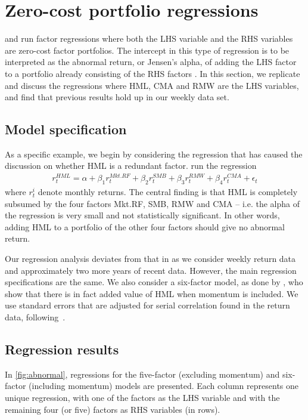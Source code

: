 
\section{Zero-cost portfolio regressions}
\label{sec:alpha_reg}
\textcite{FF2015} and \textcite{Asness2015} run factor regressions where both the LHS variable and the RHS variables are zero-cost factor portfolios. The intercept in this type of regression is to be interpreted as the abnormal return, or Jensen's alpha, of adding the LHS factor to a portfolio already consisting of the RHS factors \autocite{Jensen1968}. In this section, we replicate and discuss the regressions where HML, CMA and RMW are the LHS variables, and find that previous results hold up in our weekly data set.

\subsection{Model specification}

As a specific example, we begin by considering the regression that has caused the discussion on whether HML is a redundant factor. \textcite{FF2015} run the regression
\begin{align}
  r^{HML}_t = \alpha + \beta_1 r^{Mkt.RF}_t + \beta_2 r^{SMB}_t + \beta_3 r^{RMW}_t + \beta_4 r^{CMA}_t + \epsilon_t
\end{align}
where $r^i_t$ denote monthly returns. The central finding is that HML is completely subsumed by the four factors Mkt.RF, SMB, RMW and CMA -- i.e. the alpha of the regression is very small and not statistically significant. In other words, adding HML to a portfolio of the other four factors should give no abnormal return.

Our regression analysis deviates from that in \textcite{FF2015} as we consider weekly return data and approximately two more years of recent data. However, the main regression specifications are the same. We also consider a six-factor model, as done by \textcite{Asness2015}, who show that there is in fact added value of HML when momentum is included. We use standard errors that are adjusted for serial correlation found in the return data, following~\textcite{NeweyWest1987}.

\subsection{Regression results}

In \autoref{fig:abnormal}, regressions for the five-factor (excluding momentum) and six-factor (including momentum) models are presented. Each column represents one unique regression, with one of the factors as the LHS variable and with the remaining four (or five) factors as RHS variables (in rows).


